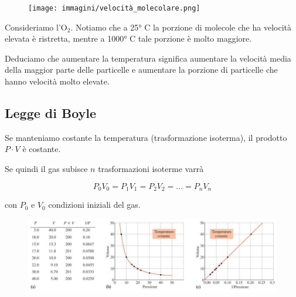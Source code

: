 
\begin{figure}[H]
    \centering
    \texttt{[image: immagini/velocità\_molecolare.png]}
\end{figure}

Consideriamo l'O$_2$. Notiamo che a 25° C la porzione di molecole che ha velocità elevata è ristretta, mentre a 1000° C tale porzione è molto maggiore.

Deduciamo che aumentare la temperatura significa aumentare la velocità media della maggior parte delle particelle e aumentare la porzione di particelle che hanno velocità molto elevate.

\subsection{Legge di Boyle}
Se manteniamo costante la temperatura (trasformazione isoterma), il prodotto $P \cdot V$ è costante.

Se quindi il gas subisce $n$ trasformazioni isoterme varrà

$$P_0V_0=P_1V_1=P_2V_2=...=P_nV_n$$

con $P_0$ e $V_0$ condizioni iniziali del gas.

\begin{figure}[htp]
    \centering
    \includegraphics[width=15cm]{immagini/Legge_di_Boyle.png}
\end{figure}


